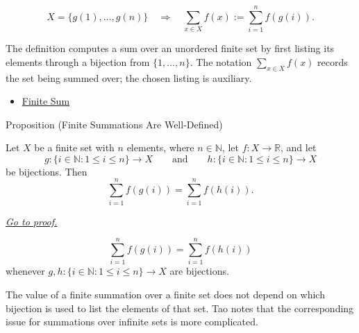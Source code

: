 \begin{remark*}
\[
  X=\{g(1),\ldots,g(n)\}
  \quad\Longrightarrow\quad
  \sum_{x\in X} f(x)
  :=
  \sum_{i=1}^{n} f(g(i)).
\]
\end{remark*}

\begin{remark*}[Interpretation]
The definition computes a sum over an unordered finite set by first listing
its elements through a bijection from \(\{1,\ldots,n\}\). The notation
\(\sum_{x\in X}f(x)\) records the set being summed over; the chosen listing
is auxiliary.
\end{remark*}

\begin{dependencies}
\begin{itemize}
  \item \hyperref[def:finite-sum]{Finite Sum}
\end{itemize}
\end{dependencies}

\begin{propositionbox}{Proposition (Finite Summations Are Well-Defined)}
\begin{proposition}
\label{prop:finite-summations-well-defined}

Let \(X\) be a finite set with \(n\) elements, where \(n \in \mathbb{N}\),
let \(f:X\to\mathbb{R}\), and let
\[
  g:\{i\in\mathbb{N}:1\le i\le n\}\to X
  \qquad\text{and}\qquad
  h:\{i\in\mathbb{N}:1\le i\le n\}\to X
\]
be bijections. Then
\[
  \sum_{i=1}^{n} f(g(i))
  =
  \sum_{i=1}^{n} f(h(i)).
\]

\smallskip
\noindent
\hyperref[prf:finite-summations-well-defined]{\textit{Go to proof.}}
\end{proposition}
\end{propositionbox}

\begin{remark*}
\[
  \sum_{i=1}^{n}f(g(i))
  =
  \sum_{i=1}^{n}f(h(i))
\]
whenever \(g,h:\{i\in\mathbb N:1\le i\le n\}\to X\) are bijections.
\end{remark*}

\begin{remark*}[Interpretation]
The value of a finite summation over a finite set does not depend on which
bijection is used to list the elements of that set. Tao notes that the
corresponding issue for summations over infinite sets is more complicated.
\end{remark*}


